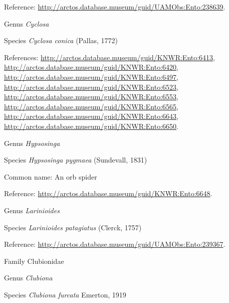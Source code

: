 \documentclass[9pt, article]{memoir}
\begin{document}
\begin{multicols}{2}
Reference: 
\url{http://arctos.database.museum/guid/UAMObs:Ento:238639}.

\vspace{6pt}\noindent\hspace{30pt}Genus \textit{Cyclosa}


\vspace{6pt}\noindent\hspace{36pt}Species \textit{Cyclosa conica} (Pallas, 1772)


References: 
\url{http://arctos.database.museum/guid/KNWR:Ento:6413}, 
\url{http://arctos.database.museum/guid/KNWR:Ento:6420}, 
\url{http://arctos.database.museum/guid/KNWR:Ento:6497}, 
\url{http://arctos.database.museum/guid/KNWR:Ento:6523}, 
\url{http://arctos.database.museum/guid/KNWR:Ento:6553}, 
\url{http://arctos.database.museum/guid/KNWR:Ento:6565}, 
\url{http://arctos.database.museum/guid/KNWR:Ento:6643}, 
\url{http://arctos.database.museum/guid/KNWR:Ento:6650}.

\vspace{6pt}\noindent\hspace{30pt}Genus \textit{Hypsosinga}


\vspace{6pt}\noindent\hspace{36pt}Species \textit{Hypsosinga pygmaea} (Sundevall, 1831)


Common name: An orb spider

Reference: 
\url{http://arctos.database.museum/guid/KNWR:Ento:6648}.

\vspace{6pt}\noindent\hspace{30pt}Genus \textit{Larinioides}


\vspace{6pt}\noindent\hspace{36pt}Species \textit{Larinioides patagiatus} (Clerck, 1757)


Reference: 
\url{http://arctos.database.museum/guid/UAMObs:Ento:239367}.

\vspace{6pt}\noindent\hspace{24pt}Family Clubionidae


\vspace{6pt}\noindent\hspace{30pt}Genus \textit{Clubiona}


\vspace{6pt}\noindent\hspace{36pt}Species \textit{Clubiona furcata} Emerton, 1919



\end{multicols}
\end{document}
